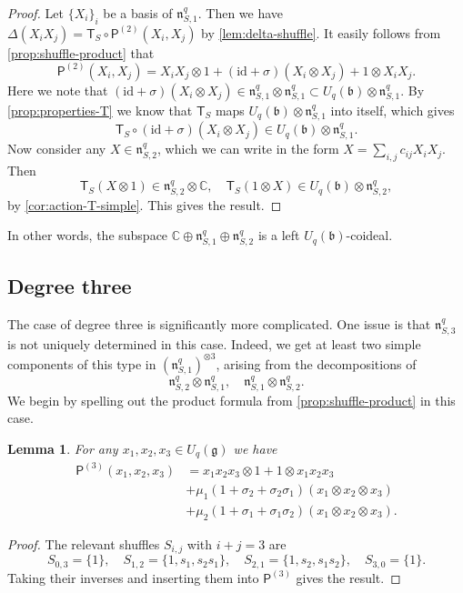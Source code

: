 \documentclass[a4paper, 12pt, reqno, english]{amsart}
\numberwithin{equation}{section}
\numberwithin{figure}{section}
\theoremstyle{plain}
\theoremstyle{plain}
\theoremstyle{plain}
\theoremstyle{plain}
\newtheorem{lemma}[theorem]{Lemma}
\theoremstyle{plain}
\theoremstyle{definition}
\theoremstyle{definition}
\theoremstyle{definition}
\theoremstyle{remark}
\theoremstyle{definition}
\theoremstyle{definition}
\newcommand{\Uqb}{U_q(\mathfrak{b})}
\newcommand{\Uqg}{U_q(\mathfrak{g})}
\newcommand{\id}{\mathrm{id}}
\newcommand{\bbC}{\mathbb{C}}
\newcommand{\lien}{\mathfrak{n}}
\newcommand{\tmapS}{\mathsf{T}_S}
\newcommand{\pmap}{\mathsf{P}}
\newcommand{\qnil}{\lien^q}
\begin{document}
\begin{proof}
Let $\{X_i\}_i$ be a basis of $\qnil_{S, 1}$.
Then we have $\Delta(X_i X_j) = \tmapS \circ \pmap^{(2)} (X_i, X_j)$ by \cref{lem:delta-shuffle}.
It easily follows from \cref{prop:shuffle-product} that
\[
\pmap^{(2)} (X_i, X_j) = X_i X_j \otimes 1 + (\id + \sigma) (X_i \otimes X_j) + 1 \otimes X_i X_j.
\]
Here we note that $(\id + \sigma) (X_i \otimes X_j) \in \qnil_{S, 1} \otimes \qnil_{S, 1} \subset \Uqb \otimes \qnil_{S, 1}$. By \cref{prop:properties-T} we know that $\tmapS$ maps $\Uqb \otimes \qnil_{S, 1}$ into itself, which gives
\[
\tmapS \circ (\id + \sigma) (X_i \otimes X_j) \in \Uqb \otimes \qnil_{S, 1}.
\]
Now consider any $X \in \qnil_{S, 2}$, which we can write in the form $X = \sum_{i, j} c_{i j} X_i X_j$. Then
\[
\tmapS(X \otimes 1) \in \qnil_{S, 2} \otimes \bbC, \quad
\tmapS(1 \otimes X) \in \Uqb \otimes \qnil_{S, 2},
\]
by \cref{cor:action-T-simple}. This gives the result.
\end{proof}

In other words, the subspace $\bbC \oplus \qnil_{S, 1} \oplus \qnil_{S, 2}$ is a left $\Uqb$-coideal.

\subsection{Degree three}

The case of degree three is significantly more complicated.
One issue is that $\qnil_{S, 3}$ is not uniquely determined in this case.
Indeed, we get at least two simple components of this type in $(\qnil_{S, 1})^{\otimes 3}$, arising from the decompositions of
\[
\qnil_{S, 2} \otimes \qnil_{S, 1}, \quad
\qnil_{S, 1} \otimes \qnil_{S, 2}.
\]
We begin by spelling out the product formula from \cref{prop:shuffle-product} in this case.

\begin{lemma}
\label{lem:shuffle-three}
For any $x_1, x_2, x_3 \in \Uqg$ we have
\[
\begin{split}
\pmap^{(3)} (x_1, x_2, x_3)
& = x_1 x_2 x_3 \otimes 1 + 1 \otimes x_1 x_2 x_3 \\
& + \mu_1 (1 + \sigma_2 + \sigma_2 \sigma_1) (x_1 \otimes x_2 \otimes x_3) \\
& + \mu_2 (1 + \sigma_1 + \sigma_1 \sigma_2) (x_1 \otimes x_2 \otimes x_3).
\end{split}
\]
\end{lemma}

\begin{proof}
The relevant shuffles $S_{i, j}$ with $i + j = 3$ are
\[
S_{0, 3} = \{ 1 \}, \quad
S_{1, 2} = \{ 1, s_1, s_2 s_1 \}, \quad
S_{2, 1} = \{ 1, s_2, s_1 s_2 \}, \quad
S_{3, 0} = \{ 1 \}.
\]
Taking their inverses and inserting them into $\pmap^{(3)}$ gives the result.
\end{proof}
\end{document}
